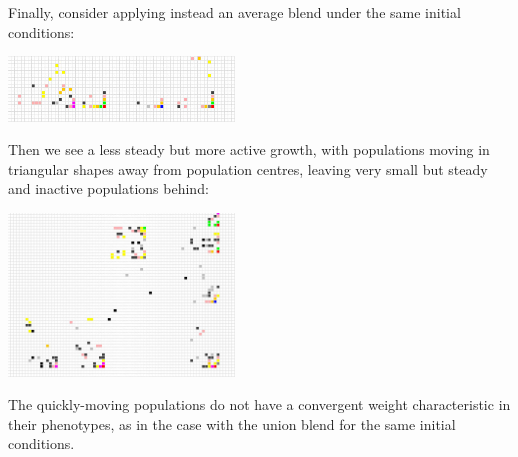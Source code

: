 \documentclass{AISB2008}
\begin{document}
Finally, consider applying instead an average blend under the same
initial conditions:
 \begin{center}
 \includegraphics[width=0.45\textwidth]{init2_average.jpg}
 \end{center}
Then we see a less steady but more active growth, with populations moving in triangular shapes away from population centres, leaving very small but steady and inactive populations behind:
 \begin{center}
 \includegraphics[width=0.45\textwidth]{init2daverage++.jpg}
 \end{center}
\noindent The quickly-moving populations do not have a convergent weight characteristic in their phenotypes, as in the case with the union blend for the same initial conditions. 




\FloatBarrier
\end{document}
